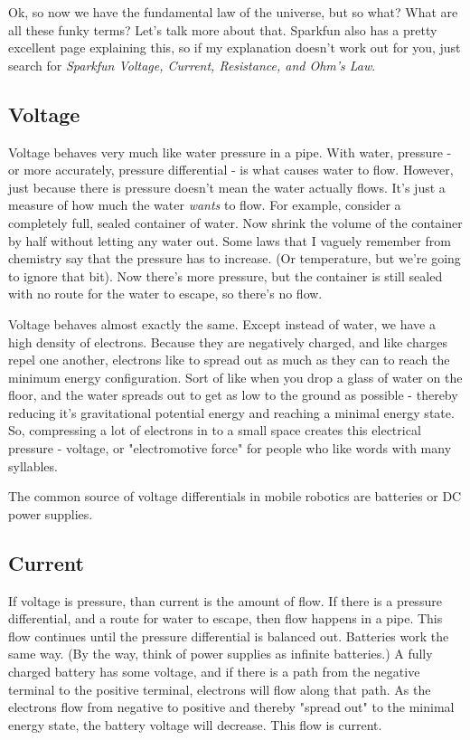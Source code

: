 Ok, so now we have the fundamental law of the universe, but so what? What are all these funky terms? Let's talk more about that. Sparkfun also has a pretty excellent page explaining this, so if my explanation doesn't work out for you, just search for \textit{Sparkfun Voltage, Current, Resistance, and Ohm's Law}.

\subsection{Voltage}
Voltage behaves very much like water pressure in a pipe. With water, pressure - or more accurately, pressure differential - is what causes water to flow. However, just because there is pressure doesn't mean the water actually flows. It's just a measure of how much the water \textit{wants} to flow. For example, consider a completely full, sealed container of water. Now shrink the volume of the container by half without letting any water out. Some laws that I vaguely remember from chemistry say that the pressure has to increase. (Or temperature, but we're going to ignore that bit). Now there's more pressure, but the container is still sealed with no route for the water to escape, so there's no flow.

Voltage behaves almost exactly the same. Except instead of water, we have a high density of electrons. Because they are negatively charged, and like charges repel one another, electrons like to spread out as much as they can to reach the minimum energy configuration. Sort of like when you drop a glass of water on the floor, and the water spreads out to get as low to the ground as possible - thereby reducing it's gravitational potential energy and reaching a minimal energy state. So, compressing a lot of electrons in to a small space creates this electrical pressure - voltage, or "electromotive force" for people who like words with many syllables.

The common source of voltage differentials in mobile robotics are batteries or DC power supplies.

\subsection{Current}

If voltage is pressure, than current is the amount of flow. If there is a pressure differential, and a route for water to escape, then flow happens in a pipe. This flow continues until the pressure differential is balanced out. Batteries work the same way. (By the way, think of power supplies as infinite batteries.) A fully charged battery has some voltage, and if there is a path from the negative terminal to the positive terminal, electrons will flow along that path. As the electrons flow from negative to positive and thereby "spread out" to the minimal energy state, the battery voltage will decrease. This flow is current.

